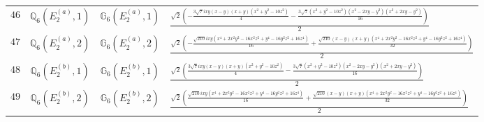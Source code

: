 \documentclass[fleqn,8pt,landscape]{jsarticle}
\begin{document}
\begin{table}[ht!]
\begin{center}
\begin{tabular}{cccl}
$ 46 $ & $ \mathbb{Q}_{6}(E_{2}^{(a)},1) $ & $ \mathbb{G}_{6}(E_{2}^{(a)},1) $ & $ \frac{\sqrt{2} \left(- \frac{3 \sqrt{7} i x y \left(x - y\right) \left(x + y\right) \left(x^{2} + y^{2} - 10 z^{2}\right)}{4} - \frac{3 \sqrt{7} \left(x^{2} + y^{2} - 10 z^{2}\right) \left(x^{2} - 2 x y - y^{2}\right) \left(x^{2} + 2 x y - y^{2}\right)}{16}\right)}{2} $ \\
$ 47 $ & $ \mathbb{Q}_{6}(E_{2}^{(a)},2) $ & $ \mathbb{G}_{6}(E_{2}^{(a)},2) $ & $ \frac{\sqrt{2} \left(- \frac{\sqrt{210} i x y \left(x^{4} + 2 x^{2} y^{2} - 16 x^{2} z^{2} + y^{4} - 16 y^{2} z^{2} + 16 z^{4}\right)}{16} + \frac{\sqrt{210} \left(x - y\right) \left(x + y\right) \left(x^{4} + 2 x^{2} y^{2} - 16 x^{2} z^{2} + y^{4} - 16 y^{2} z^{2} + 16 z^{4}\right)}{32}\right)}{2} $ \\
$ 48 $ & $ \mathbb{Q}_{6}(E_{2}^{(b)},1) $ & $ \mathbb{G}_{6}(E_{2}^{(b)},1) $ & $ \frac{\sqrt{2} \left(\frac{3 \sqrt{7} i x y \left(x - y\right) \left(x + y\right) \left(x^{2} + y^{2} - 10 z^{2}\right)}{4} - \frac{3 \sqrt{7} \left(x^{2} + y^{2} - 10 z^{2}\right) \left(x^{2} - 2 x y - y^{2}\right) \left(x^{2} + 2 x y - y^{2}\right)}{16}\right)}{2} $ \\
$ 49 $ & $ \mathbb{Q}_{6}(E_{2}^{(b)},2) $ & $ \mathbb{G}_{6}(E_{2}^{(b)},2) $ & $ \frac{\sqrt{2} \left(\frac{\sqrt{210} i x y \left(x^{4} + 2 x^{2} y^{2} - 16 x^{2} z^{2} + y^{4} - 16 y^{2} z^{2} + 16 z^{4}\right)}{16} + \frac{\sqrt{210} \left(x - y\right) \left(x + y\right) \left(x^{4} + 2 x^{2} y^{2} - 16 x^{2} z^{2} + y^{4} - 16 y^{2} z^{2} + 16 z^{4}\right)}{32}\right)}{2} $ \\
 \hline \hline
\end{tabular}
\end{center}
\end{table}
\end{document}
